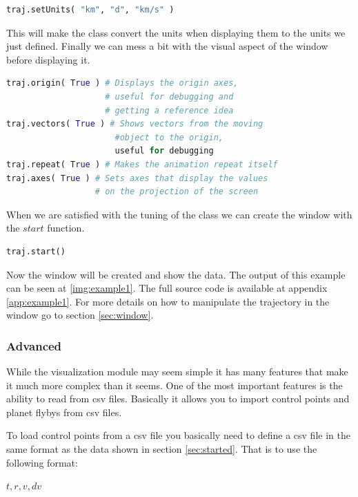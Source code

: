 \documentclass[a4paper,11pt]{article}
\begin{document}
\begin{lstlisting}[language=Python,breakatwhitespace=true]
traj.setUnits( "km", "d", "km/s" )
\end{lstlisting}

This will make the class convert the units when displaying them to the units we just defined. Finally we can mess a bit with the visual aspect of the window before displaying it.

\begin{lstlisting}[language=Python,breakatwhitespace=true]
traj.origin( True ) # Displays the origin axes,
                    # useful for debugging and
                    # getting a reference idea
traj.vectors( True ) # Shows vectors from the moving
                      #object to the origin,
                      useful for debugging
traj.repeat( True ) # Makes the animation repeat itself
traj.axes( True ) # Sets axes that display the values
                  # on the projection of the screen
\end{lstlisting}

When we are satisfied with the tuning of the class we can create the window with the $start$ function.

\begin{lstlisting}[language=Python,breakatwhitespace=true]
traj.start()
\end{lstlisting}

Now the window will be created and show the data. The output of this example can be seen at \ref{img:example1}. The full source code is available at appendix \ref{app:example1}. For more details on how to manipulate the trajectory in the window go to section \ref{sec:window}.


\subsubsection{Advanced}\label{sec:advanced}

While the visualization module may seem simple it has many features that make it much more complex than it seems. One of the most important features is the ability to read from \gls{csv} files. Basically it allows you to import control points and planet flybys from \gls{csv} files.

To load control points from a \gls{csv} file you basically need to define a \gls{csv} file in the same format as the data shown in section \ref{sec:started}. That is to use the following format:

$ t, r, v, dv $
\end{document}
